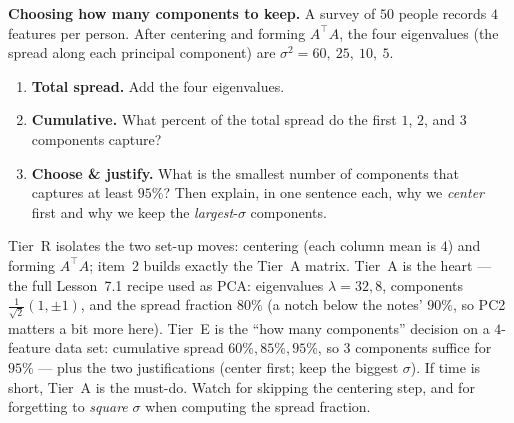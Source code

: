 \documentclass[10pt]{article}
\newcommand{\T}{^{\top}}
\begin{document}
\begin{tcolorbox}[colback=white, colframe=black!40, title=\textbf{Tier E --- Extension},
    fonttitle=\bfseries, arc=1.5mm, left=3mm, right=3mm, top=2mm, bottom=2mm, breakable]
\textbf{Choosing how many components to keep.} A survey of $50$ people records $4$ features per person. After
centering and forming $A\T A$, the four eigenvalues (the spread along each principal component) are
$\sigma^2=60,\ 25,\ 10,\ 5$.
\begin{enumerate}[leftmargin=1.7em, itemsep=9pt]
  \item \textbf{Total spread.} Add the four eigenvalues. 
  \item \textbf{Cumulative.} What percent of the total spread do the first $1$, $2$, and $3$ components capture?
  \item \textbf{Choose \& justify.} What is the smallest number of components that captures at least $95\%$? Then explain, in one sentence each, why we \emph{center} first and why we keep the \emph{largest}-$\sigma$ components.
\end{enumerate}
\end{tcolorbox}

\begin{teachernote}
Tier~R isolates the two set-up moves: centering (each column mean is $4$) and forming $A\T A$; item~2 builds
exactly the Tier~A matrix. Tier~A is the heart --- the full Lesson~7.1 recipe used as PCA: eigenvalues
$\lambda=32,8$, components $\tfrac1{\sqrt2}(1,\pm1)$, and the spread fraction $80\%$ (a notch below the notes'
$90\%$, so PC2 matters a bit more here). Tier~E is the ``how many components'' decision on a $4$-feature data
set: cumulative spread $60\%,85\%,95\%$, so $3$ components suffice for $95\%$ --- plus the two justifications
(center first; keep the biggest $\sigma$). If time is short, Tier~A is the must-do. Watch for skipping the
centering step, and for forgetting to \emph{square} $\sigma$ when computing the spread fraction.
\end{teachernote}
\end{document}
